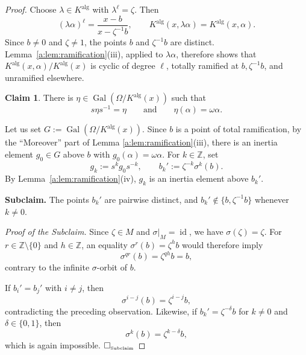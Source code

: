 \documentclass[10pt,a4paper]{amsart}
\theoremstyle{definition}
\newtheorem{claim}{Claim}
\newenvironment{claimproof}[1][Proof of Claim \theclaim.]
 {%
	\proof[#1]%
\renewcommand*\qedsymbol{$\square$\tiny{Claim \theclaim}}
}
{%
	\endproof%
}
\newcommand{\Z}{\mathbb Z}
\newcommand{\alg}{\mathrm{alg}}
\DeclareMathOperator{\Gal}{Gal}
\DeclareMathOperator{\id}{id}
\begin{document}
\begin{proof}
Choose $\lambda\in K^{\alg}$ with $\lambda^\ell=\zeta$.
Then
\[
(\lambda\alpha)^\ell
=\frac{x-b}{x-\zeta^{-1}b},
\qquad
K^{\alg}(x,\lambda\alpha)=K^{\alg}(x,\alpha).
\]
Since $b\ne0$ and $\zeta\ne1$, the points $b$ and
$\zeta^{-1}b$ are distinct.
Lemma~\ref{a:lem:ramification}(iii), applied to
$\lambda\alpha$, therefore shows that
$K^{\alg}(x,\alpha)/K^{\alg}(x)$ is cyclic of degree $\ell$,
totally ramified at $b,\zeta^{-1}b$, and unramified elsewhere.
\begin{claim}\label{cl2}
There is $\eta\in \Gal(\Omega/K^\alg(x))$ such that
\[
s\eta s^{-1}=\eta\qquad \text{and}\qquad \eta(\alpha)=\omega\alpha.
\]
\end{claim}
\begin{claimproof}
Let us set $G:=\Gal(\Omega/K^\alg(x))$. Since $b$ is a point of total ramification, by the ``Moreover'' part of Lemma \ref{a:lem:ramification}(iii), there is  an inertia element $g_0\in G$ above $b$ with
$g_0(\alpha)=\omega\alpha$. For $k\in\Z$, set
\[
g_k:=s^kg_0s^{-k},\qquad b_k':=\zeta^{-k}\sigma^k(b).
\]
By Lemma~\ref{a:lem:ramification}(iv), $g_k$ is an inertia
element above $b_k'$.

\smallskip
\noindent\textbf{Subclaim.}
The points $b_k'$ are pairwise distinct, and
$b_k'\notin\{b,\zeta^{-1}b\}$ whenever $k\ne0$.

\smallskip
\noindent\emph{Proof of the Subclaim.}
Since $\zeta\in M$ and $\sigma|_M=\id$, we have
$\sigma(\zeta)=\zeta$.
For $r\in\Z\setminus\{0\}$ and $h\in\Z$, an equality
$\sigma^r(b)=\zeta^h b$ would therefore imply
\[
\sigma^{qr}(b)=\zeta^{qh}b=b,
\]
contrary to the infinite $\sigma$-orbit of $b$.

If $b_i'=b_j'$ with $i\ne j$, then
\[
\sigma^{i-j}(b)=\zeta^{i-j}b,
\]
contradicting the preceding observation.
Likewise, if $b_k'=\zeta^{-\delta}b$ for
$k\ne0$ and $\delta\in\{0,1\}$, then
\[
\sigma^k(b)=\zeta^{k-\delta}b,
\]
which is again impossible.
\hfill$\square_{\text{\tiny Subclaim}}$


\end{claimproof}
\end{proof}
\end{document}
